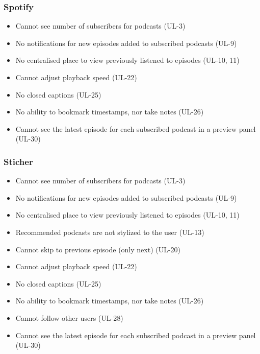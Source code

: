\documentclass[12pt]{article}
\begin{document}
\iffalse %
\subsubsection{Spotify\cite{spotify}}


\begin{itemize}
    \item Cannot see number of subscribers for podcasts (UL-3)
    \item No notifications for new episodes added to subscribed podcasts (UL-9)
    \item No centralised place to view previously listened to episodes (UL-10, 11)
    \item Cannot adjust playback speed (UL-22)
    \item No closed captions (UL-25)
    \item No ability to bookmark timestamps, nor take notes (UL-26)
    \item Cannot see the latest episode for each subscribed podcast in a preview panel (UL-30)
\end{itemize}

\subsubsection{Sticher\cite{sticher}}

\begin{itemize}
    \item Cannot see number of subscribers for podcasts (UL-3)
    \item No notifications for new episodes added to subscribed podcasts (UL-9)
    \item No centralised place to view previously listened to episodes (UL-10, 11)
    \item Recommended podcasts are not stylized to the user (UL-13)
    \item Cannot skip to previous episode (only next) (UL-20)
    \item Cannot adjust playback speed (UL-22)
    \item No closed captions (UL-25)
    \item No ability to bookmark timestamps, nor take notes (UL-26)
    \item Cannot follow other users (UL-28)
    \item Cannot see the latest episode for each subscribed podcast in a preview panel (UL-30)
\end{itemize}
\end{document}

